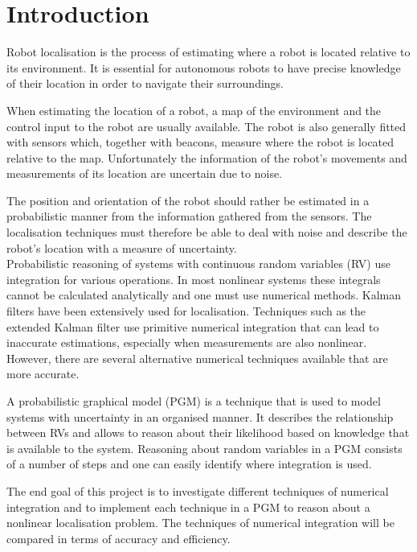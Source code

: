 \documentclass[12pt,oneside,openany,a4paper, %
afrikaans,english,
]{memoir}
\numberwithin{equation}{chapter}
\begin{document}
\mainmatter
\chapter{Introduction}
Robot localisation is the process of estimating where a robot is located relative to its environment. It is essential for autonomous robots to have precise knowledge of their location in order to navigate their surroundings.

When estimating the location of a robot, a map of the environment and the control input to the robot are usually available. The robot is also generally fitted with sensors which, together with beacons, measure where the robot is located relative to the map. Unfortunately the information of the robot's movements and measurements of its location are uncertain due to noise.

The position and orientation of the robot should rather be estimated in a probabilistic manner from the information gathered from the sensors. The localisation techniques must therefore be able to deal with noise and describe the robot's location with a measure of uncertainty.\\
Probabilistic reasoning of systems with continuous random variables (RV) use integration for various operations. In most nonlinear systems these integrals cannot be calculated analytically and one must use numerical methods. Kalman filters have been extensively used for localisation. Techniques such as the extended Kalman filter use primitive numerical integration that can lead to inaccurate estimations, especially when measurements are also nonlinear. However, there are several alternative numerical techniques available that are more accurate.

A probabilistic graphical model (PGM) is a technique that is used to model systems with uncertainty in an organised manner. It describes the relationship between RVs and allows to reason about their likelihood based on knowledge that is available to the system. Reasoning about random variables in a PGM consists of a number of steps and one can easily identify where integration is used.

The end goal of this project is to investigate different techniques of numerical integration and to implement each technique in a PGM to reason about a nonlinear localisation problem. The techniques of numerical integration will be compared in terms of accuracy and efficiency.
\setcounter{secnumdepth}{2}
\end{document}
